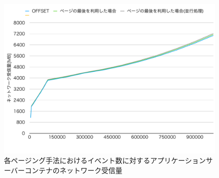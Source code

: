 \documentclass[../../../../../main]{subfiles}
\begin{document}
    \begin{figure}[H]
        \centering
        \includegraphics[width=12cm]{graph}
        \caption{各ページング手法におけるイベント数に対するアプリケーションサーバーコンテナのネットワーク受信量}
        \label{fig:each-paging-app-net-in-app_1_1024-db_1_1024}
    \end{figure}
\end{document}
